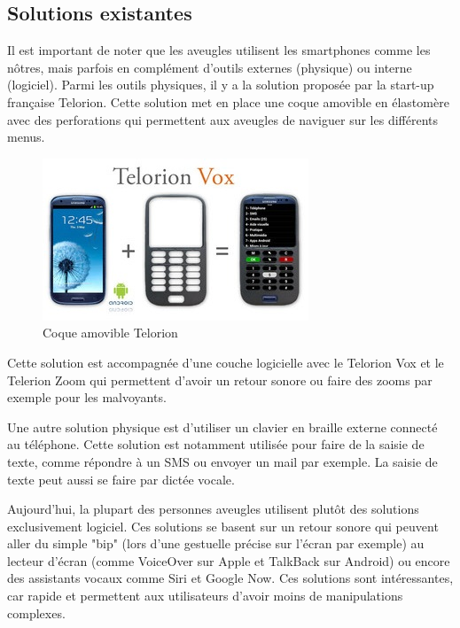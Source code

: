 \documentclass[UTF8]{EPURapport}
\begin{document}
\subsection{Solutions existantes}
Il est important de noter que les aveugles utilisent les smartphones comme les nôtres, mais parfois en complément d'outils externes (physique) ou interne (logiciel). Parmi les outils physiques, il y a la solution proposée par la start-up française Telorion. Cette solution met en place une coque amovible en élastomère avec des perforations qui permettent aux aveugles de naviguer sur les différents menus.

\newpage

\begin{figure}[h!]
\centering
  \includegraphics[width=.7\textwidth]{images/telorion_case.JPG}
  \caption{Coque amovible Telorion}
  \label{fig:telorioncase}
\end{figure}

Cette solution est accompagnée d'une couche logicielle avec le Telorion Vox et le Telerion Zoom qui permettent d'avoir un retour sonore ou faire des zooms par exemple pour les malvoyants.

Une autre solution physique est d'utiliser un clavier en braille externe connecté au téléphone. Cette solution est notamment utilisée pour faire de la saisie de texte, comme répondre à un SMS ou envoyer un mail par exemple. La saisie de texte peut aussi se faire par dictée vocale.

Aujourd'hui, la plupart des personnes aveugles utilisent plutôt des solutions exclusivement logiciel. Ces solutions se basent sur un retour sonore qui peuvent aller du simple "bip" (lors d'une gestuelle précise sur l'écran par exemple) au lecteur d'écran (comme VoiceOver sur Apple et TalkBack sur Android) ou encore des assistants vocaux comme Siri et Google Now. Ces solutions sont intéressantes, car rapide et permettent aux utilisateurs d'avoir moins de manipulations complexes.
\end{document}
